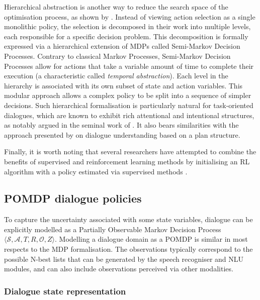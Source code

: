 Hierarchical abstraction is another way to reduce the search space of the optimisation process, as shown by \cite{Heriberto2011}. Instead of viewing action selection as a single monolithic policy, the selection is decomposed in their work into multiple levels, each responsible for a specific decision problem.  This decomposition is formally expressed via a hierarchical extension of MDPs called Semi-Markov Decision Processes.  Contrary to classical Markov Processes, Semi-Markov Decision Processes allow for actions that take a variable amount of time to complete their execution (a characteristic called \textit{temporal abstraction}). Each level in the hierarchy is associated with its own subset of state and action variables.  This modular approach allows a complex policy to be split into a sequence of simpler decisions.  Such hierarchical formalisation is particularly natural for task-oriented dialogues, which are known to exhibit rich attentional and intentional structures, as notably argued in the seminal work of \cite{Grosz:1986}. It also bears similarities with the approach presented by \cite{Litman87} on dialogue understanding based on a plan structure. 

Finally, it is worth noting that several researchers have attempted to combine the benefits of supervised and reinforcement learning methods by initialising an RL algorithm with a policy estimated via supervised methods \citep{williams2003, rieser2006}.

\subsection{POMDP dialogue policies}

To capture the uncertainty associated with some state variables, dialogue can be explicitly modelled as a Partially Observable Markov Decision Process $\langle \mathcal{S}, \mathcal{A}, T, R, \mathcal{O}, Z \rangle$.  Modelling a dialogue domain as a POMDP is similar in most respects to the MDP formalisation.  The observations typically correspond to the possible N-best lists that can be generated by the speech recogniser and NLU modules, and can also include observations perceived via other modalities.  

\subsubsection*{Dialogue state representation}

